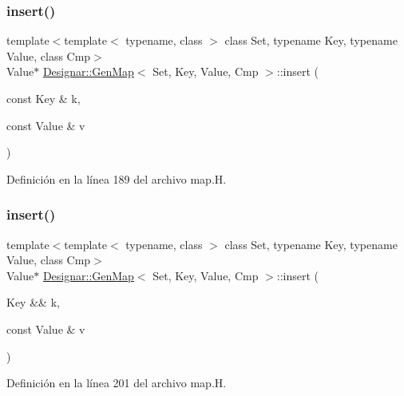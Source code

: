 \subsubsection{\texorpdfstring{insert()}{insert()}\hspace{0.1cm}{\footnotesize\ttfamily [1/4]}}
{\footnotesize\ttfamily template$<$template$<$ typename, class $>$ class Set, typename Key, typename Value, class Cmp$>$ \\
Value$\ast$ \hyperlink{class_designar_1_1_gen_map}{Designar\+::\+Gen\+Map}$<$ Set, Key, Value, Cmp $>$\+::insert (\begin{DoxyParamCaption}\item[{const Key \&}]{k,  }\item[{const Value \&}]{v }\end{DoxyParamCaption})\hspace{0.3cm}{\ttfamily [inline]}}



Definición en la línea 189 del archivo map.\+H.

\mbox{\label{class_designar_1_1_gen_map_aabd1f531f63985a2eabbeea49d90156e}} 
\subsubsection{\texorpdfstring{insert()}{insert()}\hspace{0.1cm}{\footnotesize\ttfamily [2/4]}}
{\footnotesize\ttfamily template$<$template$<$ typename, class $>$ class Set, typename Key, typename Value, class Cmp$>$ \\
Value$\ast$ \hyperlink{class_designar_1_1_gen_map}{Designar\+::\+Gen\+Map}$<$ Set, Key, Value, Cmp $>$\+::insert (\begin{DoxyParamCaption}\item[{Key \&\&}]{k,  }\item[{const Value \&}]{v }\end{DoxyParamCaption})\hspace{0.3cm}{\ttfamily [inline]}}



Definición en la línea 201 del archivo map.\+H.

\mbox{\label{class_designar_1_1_gen_map_a8fc2565be30a92687eea7f752b289751}} 
